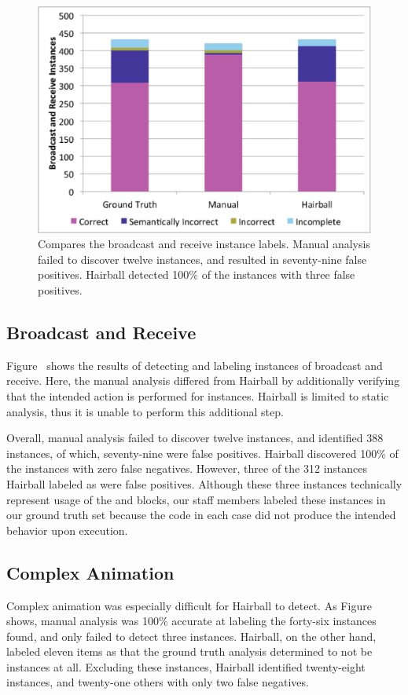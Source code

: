\begin{figure}[!t]
\centering
\includegraphics[trim=.3in .15in .3in .15in, clip,
  width=5.25in]{graphs/AutoBroadcastReceive.eps}
\caption{Compares the broadcast and receive instance labels. Manual analysis
  failed to discover twelve instances, and resulted in seventy-nine false
  positives. Hairball detected 100\% of the instances with three false
  positives.}
\end{figure}

\subsection{Broadcast and Receive}
Figure~ shows the results of detecting and
labeling instances of broadcast and receive. Here, the manual analysis differed
from Hairball by additionally verifying that the intended action is performed
for \correct{} instances. Hairball is limited to static analysis, thus it is
unable to perform this additional step.

Overall, manual analysis failed to discover twelve instances, and identified
388 \correct{} instances, of which, seventy-nine were false positives. Hairball
discovered 100\% of the instances with zero false negatives. However, three of
the 312 instances Hairball labeled as \correct{} were false positives. Although
these three instances technically represent \correct{} usage of the
\broadcast{} and \receive{} blocks, our staff members labeled these instances
\incor{} in our ground truth set because the code in each case did not produce
the intended behavior upon execution.


\subsection{Complex Animation}
Complex animation was especially difficult for Hairball to detect.  As
Figure~ shows, manual analysis was 100\% accurate at
labeling the forty-six instances found, and only failed to detect three
instances. Hairball, on the other hand, labeled eleven items as \incom{} that
the ground truth analysis determined to not be instances at all. Excluding
these instances, Hairball identified twenty-eight \correct{} instances, and
twenty-one others with only two false negatives.

